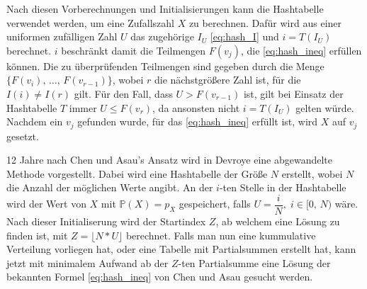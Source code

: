 Nach diesen Vorberechnungen und Initialisierungen kann die Hashtabelle verwendet 
werden, um eine Zufallszahl $X$ zu berechnen. Dafür wird aus einer uniformen 
zufälligen Zahl $U$ das zugehörige $I_U$ \eqref{eq:hash_I} und $i = T(I_U)$ berechnet. $i$ 
beschränkt damit die Teilmengen $F(v_j)$, die \eqref{eq:hash_ineq} erfüllen 
können. Die zu überprüfenden Teilmengen sind gegeben durch die Menge $\{F(v_i),\, \dots,
\, F(v_{r-1})\}$, wobei $r$ die nächstgrößere Zahl ist, für die $I(i) \neq I(r)$ 
gilt. Für den Fall, dass $U > F(v_{r-1})$ ist, gilt bei Einsatz der Hashtabelle 
$T$ immer $U \leq F(v_r)$, da ansonsten nicht $i = T(I_U)$ gelten würde. Nachdem 
ein $v_j$ gefunden wurde, für das \eqref{eq:hash_ineq} erfüllt ist, wird $X$ auf 
$v_j$ gesetzt.

12 Jahre nach Chen und Asau's Ansatz wird in Devroye 
\cite{devroye-non_uniform_random_variate-1986} eine abgewandelte Methode 
vorgestellt. Dabei wird eine Hashtabelle der Größe $N$ erstellt, wobei $N$ die 
Anzahl der möglichen Werte angibt. An der $i$-ten Stelle in der Hashtabelle wird 
der Wert von $X$ mit $\mathbb{P}(X) = p_X$ gespeichert, falls $U = \dfrac{i}{N},\; i \in 
[0,\, N)$ wäre. Nach dieser Initialiserung wird der Startindex $Z$, ab welchem 
eine Lösung zu finden ist, mit $Z = \lfloor N * U \rfloor$ berechnet. Falls man 
nun eine kummulative Verteilung vorliegen hat, oder eine Tabelle mit Partialsummen 
erstellt hat, kann jetzt mit minimalem Aufwand ab der $Z$-ten Partialsumme eine 
Lösung der bekannten Formel \eqref{eq:hash_ineq} von Chen und Asau gesucht werden.
